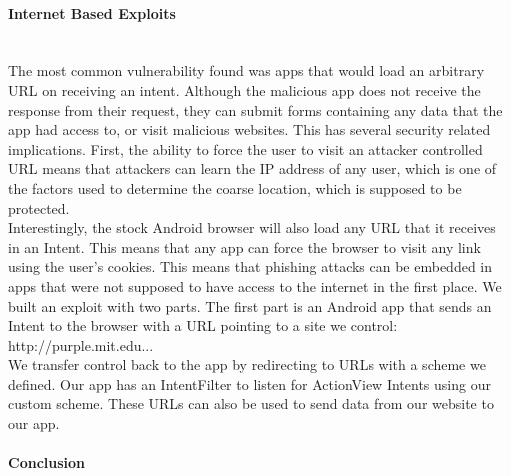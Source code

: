 \documentclass[12pt,a4paper]{article}
\begin{document}
\paragraph{Internet Based Exploits} ~\\
The most common vulnerability found was apps that would load an arbitrary URL on receiving an intent. Although the malicious app does not receive the response from their request, they can submit forms containing any data that the app had access to, or visit malicious websites. This has several security related implications. First, the ability to force the user to visit an attacker controlled URL means that attackers can learn the IP address of any user, which is one of the factors used to determine the coarse location, which is supposed to be protected.  \\
Interestingly, the stock Android browser will also load any URL that it receives in an Intent. This means that any app can force the browser to visit any link using the user's cookies. This means that phishing attacks can be embedded in apps that were not supposed to have access to the internet in the first place.
We built an exploit with two parts. The first part is an Android app that sends an Intent to the browser with a URL pointing to a site we control: http://purple.mit.edu... \\
We transfer control back to the app by redirecting to URLs with a scheme we defined. Our app has an IntentFilter to listen for ActionView Intents using our custom scheme. These URLs can also be used to send data from our website to our app.

\paragraph{Conclusion} ~\\

 
\end{document}
